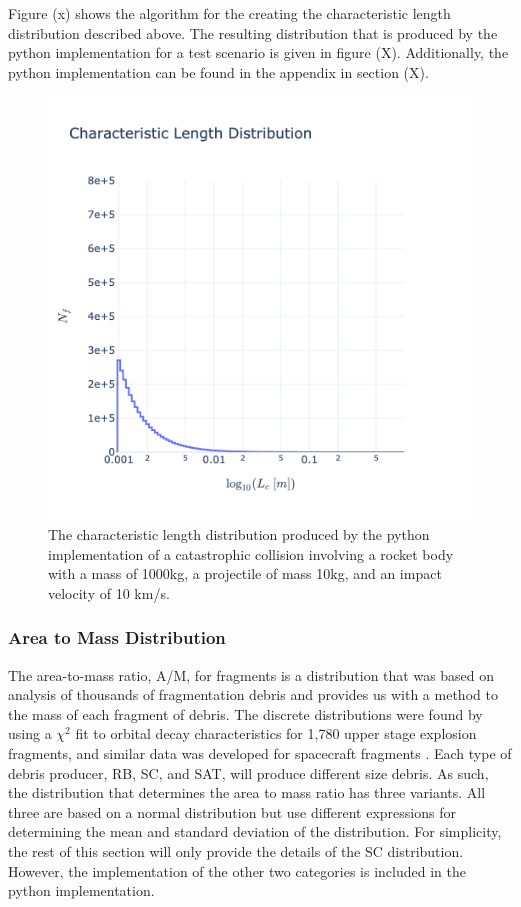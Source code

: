 \documentclass[a4paper, 12pt]{article}
\begin{document}
Figure (x) shows the algorithm for the creating the characteristic length distribution described above.  The resulting distribution that is produced by the python implementation for a test scenario is given in figure (X). Additionally, the python implementation can be found in the appendix in section (X).
\begin{figure}[H]
	\centering
	\includegraphics[scale=0.3, trim=0cm 0cm 0cm 10cm]{N_f_vs_L_c}
	\caption{The characteristic length distribution produced by the python implementation of a catastrophic collision involving a rocket body with a mass of 1000kg, a projectile of mass 10kg, and an impact velocity of 10 km/s.}
\end{figure}

\subsubsection{Area to Mass Distribution }

The area-to-mass ratio, A/M, for fragments is a distribution that was based on analysis of thousands of fragmentation debris and provides us with a method to the mass of each fragment of debris. The discrete distributions were found by using a $\chi^2$ fit to orbital decay characteristics for 1,780 upper stage explosion fragments, and similar data was developed for spacecraft fragments \citep{johnson_nasas_2001}. Each type of debris producer, RB, SC, and SAT, will produce different size debris. As such, the distribution that determines the area to mass ratio has three variants. All three are based on a normal distribution but use different expressions for determining the mean and standard deviation of the distribution. For simplicity, the rest of this section will only provide the details of the SC distribution. However, the implementation of the other two categories is included in the python implementation.
\end{document}
